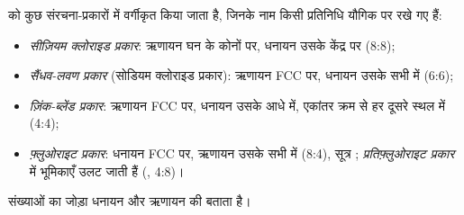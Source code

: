 \begin{definition}[संरचना-प्रकार]\label{def:b1:crystals-ionic-covalent:structure-type}
 को कुछ संरचना-प्रकारों में वर्गीकृत किया जाता है, जिनके नाम
किसी प्रतिनिधि यौगिक पर रखे गए हैं:
\begin{itemize}
  \item \emph{सीज़ियम क्लोराइड प्रकार}: ऋणायन
        घन के कोनों पर, धनायन उसके केंद्र पर (8:8);
  \item \emph{सैंधव-लवण प्रकार} (सोडियम क्लोराइड
        प्रकार): ऋणायन FCC  पर, धनायन उसके सभी  में (6:6);
  \item \emph{ज़िंक-ब्लेंड प्रकार}: ऋणायन FCC
         पर, धनायन उसके आधे  में, एकांतर क्रम से हर दूसरे
        स्थल में (4:4);
  \item \emph{फ़्लुओराइट प्रकार}: धनायन FCC
         पर, ऋणायन उसके सभी  में (8:4), सूत्र
        ; \emph{प्रतिफ़्लुओराइट प्रकार} में
        भूमिकाएँ उलट जाती हैं (, 4:8)।
\end{itemize}
संख्याओं का जोड़ा धनायन और ऋणायन की 
बताता है।
\end{definition}

